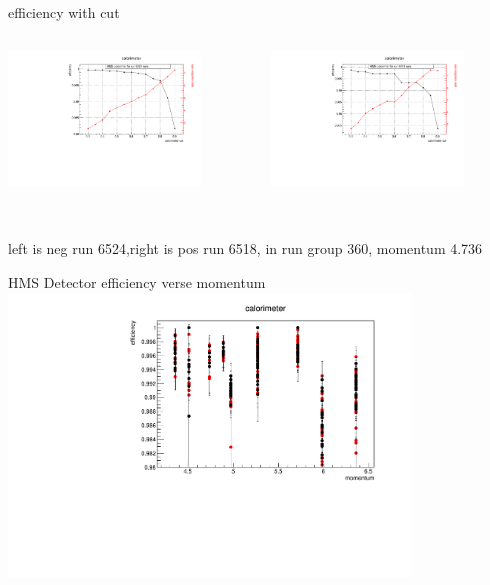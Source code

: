 \documentclass[aspectratio=169,xcolor=dvipsnames]{beamer}
\begin{document}
\begin{frame}{ efficiency with cut}
  \begin{columns}
    \begin{column}[T]{0.5\textwidth}
  \includegraphics[width = 0.8\textwidth]{results/pid/HMS_cal_6524.pdf}
\end{column}
\begin{column}[T]{0.5\textwidth}
  \includegraphics[width = 0.8\textwidth]{results/pid/HMS_cal_6518.pdf}
\end{column}
\end{columns}
  \\
  left is neg run 6524,right is pos run 6518, in run group 360, momentum 4.736
\end{frame}
\begin{frame}{HMS Detector efficiency verse momentum}
  \includegraphics[width = 0.8\textwidth]{results/pid/HMS_cal_DE_momentum.pdf}
\end{frame}
\end{document}

